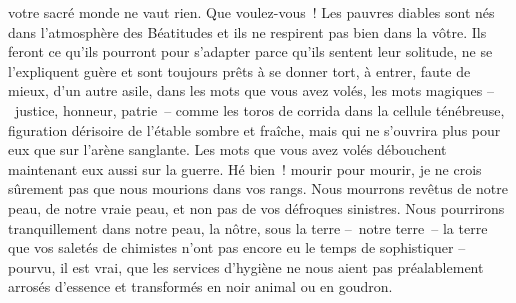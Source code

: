 \documentclass[french,twoside]{book} %
\begin{document}
votre sacré monde ne vaut rien. Que voulez-vous ! Les pauvres diables sont nés dans l’atmosphère des Béatitudes et ils ne respirent pas bien dans la vôtre. Ils feront ce qu’ils pourront pour s’adapter parce qu’ils sentent leur solitude, ne se l’expliquent guère et sont toujours prêts à se donner tort, à entrer, faute de mieux, d’un autre asile, dans les mots que vous avez volés, les mots magiques – justice, honneur, patrie – comme les toros de corrida dans la cellule ténébreuse, figuration dérisoire de l’étable sombre et fraîche, mais qui ne s’ouvrira plus pour eux que sur l’arène sanglante. Les mots que vous avez volés débouchent maintenant eux aussi sur la guerre. Hé bien ! mourir pour mourir, je ne crois sûrement pas que nous mourions dans vos rangs. Nous mourrons revêtus de notre peau, de notre vraie peau, et non pas de vos défroques sinistres. Nous pourrirons tranquillement dans notre peau, la nôtre, sous la terre – notre terre – la terre que vos saletés de chimistes n’ont pas encore eu le temps de sophistiquer – pourvu, il est vrai, que les services d’hygiène ne nous aient pas préalablement arrosés d’essence et transformés en noir animal ou en goudron.
\end{document}
